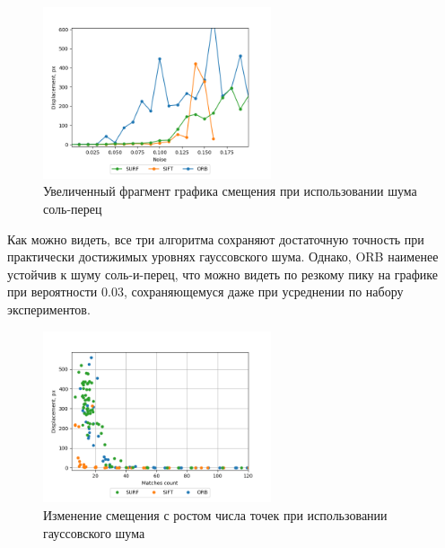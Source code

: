 {	\begin{figure}[H]
		\centering                             
		\includegraphics[width=0.60\textwidth,keepaspectratio]{ex2/sp/Rand_noises_displacement_big.png}       
		\centering\caption{ Увеличенный фрагмент графика смещения при использовании шума соль-перец }
		\label{sp disp big}                           
	\end{figure}    
	
	Как можно видеть, все три алгоритма сохраняют достаточную точность при практически достижимых уровнях гауссовского шума. Однако, ORB наименее устойчив к шуму соль-и-перец, что можно видеть по резкому пику на графике при вероятности 0.03, сохраняющемуся даже при усреднении по набору экспериментов.
	
	\begin{figure}[H]
		\centering                             
		\includegraphics[width=0.6\textwidth,keepaspectratio]{ex2/gauss/Rand_noises_d_by_m.png}      
		\centering\caption{ Изменение смещения с ростом числа точек при использовании гауссовского шума}
		\label{rand_noises_gauss_b_by_m}                           
	\end{figure} 
	
}

